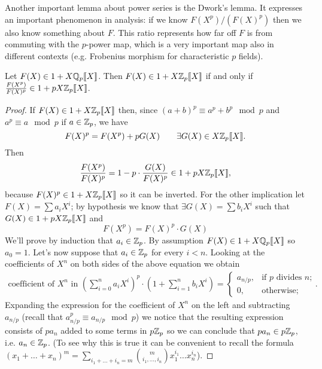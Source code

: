 		Another important lemma about \padic power series is the Dwork's lemma. It expresses an important phenomenon in \padic analysis: if we know $F(X^p)/(F(X)^p)$ then we also know something about $F$. This ratio represents how far off $F$ is from commuting with the $p$-power map, which is a very important map also in different contexts (e.g. Frobenius morphism for characteristic $p$ fields).
		\begin{lemma}
			\label{lemma:dwork}
			Let $F(X) \in 1 + X\mathbb{Q}_p\llbracket {X} \rrbracket$. Then $F(X) \in 1 + X\mathbb{Z}_p\llbracket {X} \rrbracket$ if and only if $\tfrac{F(X^p)}{F(X)^p} \in 1 + pX\mathbb{Z}_p\llbracket {X} \rrbracket$.
		\end{lemma}
		\begin{proof}
			If $F(X) \in 1 + X\mathbb{Z}_p\llbracket {X} \rrbracket$ then, since $(a + b)^p \equiv a^p + b^p \mod p$ and $a^p \equiv a \mod p$ if $a \in \mathbb{Z}_p$, we have
			\[
			F(X)^p = F(X^p) + pG(X) \qquad \exists G(X) \in X\mathbb{Z}_p\llbracket {X} \rrbracket.
			\]
			Then
			\[
			\frac{F(X^p)}{F(X)^p} = 1 - p\cdot\frac{G(X)}{F(X)^p} \in 1 + pX\mathbb{Z}_p\llbracket {X} \rrbracket,
			\]
			because $F(X)^p \in 1 + X\mathbb{Z}_p\llbracket {X} \rrbracket$ so it can be inverted.\newline
			For the other implication let
			$F(X) = \sum a_iX^i$; by hypothesis we know that $\exists G(X) = \sum b_iX^i$ such that $G(X) \in 1 + pX\mathbb{Z}_p\llbracket {X} \rrbracket$ and 
			\[
			F(X^p) = F(X)^p\cdot G(X)
			\]
			We'll prove by induction that $a_i \in \mathbb{Z}_p$. By assumption $F(X) \in 1 + X\mathbb{Q}_p\llbracket {X} \rrbracket$ so $a_0 = 1$. Let's now suppose that $a_i \in \mathbb{Z}_p$ for every $i < n$. Looking at the coefficients of $X^n$ on both sides of the above equation we obtain
			\begin{gather*}
				\text{coefficient of $X^n$ in } \left(\sum_{i=0}^n a_iX^i\right)^p\cdot\left(1 + \sum_{i=1}^n b_iX^i\right) = 
				\begin{cases}
					a_{n/p}, & \text{if $p$ divides $n$;}\\
					0, & \text{otherwise;}
				\end{cases}.
			\end{gather*}
			Expanding the expression for the coefficient of $X^n$ on the left and subtracting $a_{n/p}$ (recall that $a_{n/p}^p \equiv a_{n/p} \mod p$) we notice that the resulting expression consists of $pa_n$ added to some terms in $p\mathbb{Z}_p$ so we can conclude that $pa_n \in p\mathbb{Z}_p$, i.e. $a_n \in \mathbb{Z}_p$. (To see why this is true it can be convenient to recall the formula $(x_1 + \dots + x_n)^m = \sum_{i_1 + \dots + i_n = m} \binom{m}{i_1, \dots, i_n} x_1^{i_1}\dots x_n^{i_n}$).
		\end{proof}
	
